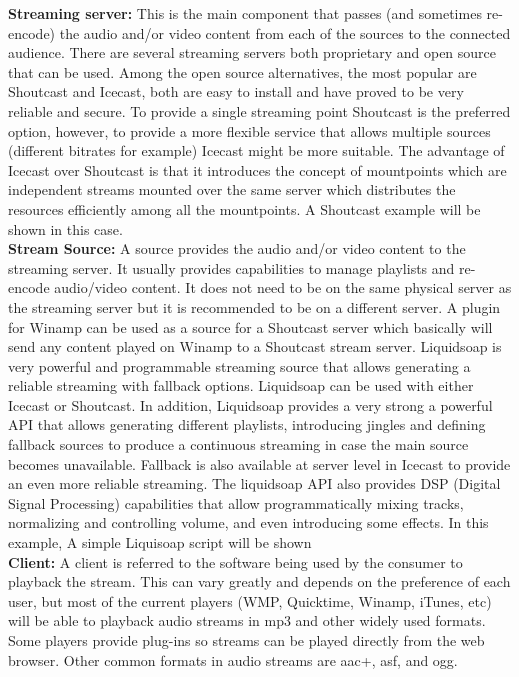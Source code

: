 \textbf{Streaming server:}  This is the main component that passes (and sometimes re-encode) the audio and/or video content from each of the sources to the connected audience. There are several streaming servers both proprietary and open source that can be used. Among the open source alternatives, the most popular are Shoutcast and Icecast, both are easy to install and have proved to be very reliable and secure. To provide a single streaming point Shoutcast is the preferred option, however, to provide a more flexible service that allows multiple sources (different bitrates for example) Icecast might be more suitable. The advantage of Icecast over Shoutcast is that it introduces the concept of mountpoints which are independent streams mounted over the same server which distributes the resources efficiently among all the mountpoints. A Shoutcast example will be shown in this case.\\
\textbf{Stream Source:} A source provides the audio and/or video content to the streaming server. It usually provides capabilities to manage playlists and re-encode audio/video content. It does not need to be on the same physical server as the streaming server but it is recommended to be on a different server. A plugin for Winamp can be used as a source for a Shoutcast server which basically will send any content played on Winamp to a Shoutcast stream server. Liquidsoap is very powerful and programmable streaming source that allows generating a reliable streaming with fallback options. Liquidsoap can be used with either Icecast or Shoutcast. In addition, Liquidsoap provides a very strong a powerful API that allows generating different playlists, introducing jingles and defining fallback sources to produce a continuous streaming in case the main source becomes unavailable. Fallback is also available at server level in Icecast to provide an even more reliable streaming. The liquidsoap API also provides DSP (Digital Signal Processing) capabilities that allow programmatically mixing tracks, normalizing and controlling volume, and even introducing some effects. In this example, A simple Liquisoap script will be shown\\
\textbf{Client:} A client is referred to the software being used by the consumer to playback the stream.  This can vary greatly and depends on the preference of each user, but most of the current players (WMP, Quicktime, Winamp, iTunes, etc) will be able to playback audio streams in mp3 and other widely used formats. Some players provide plug-ins so streams can be played directly from the web browser. Other common formats in audio streams are aac+, asf, and ogg.




